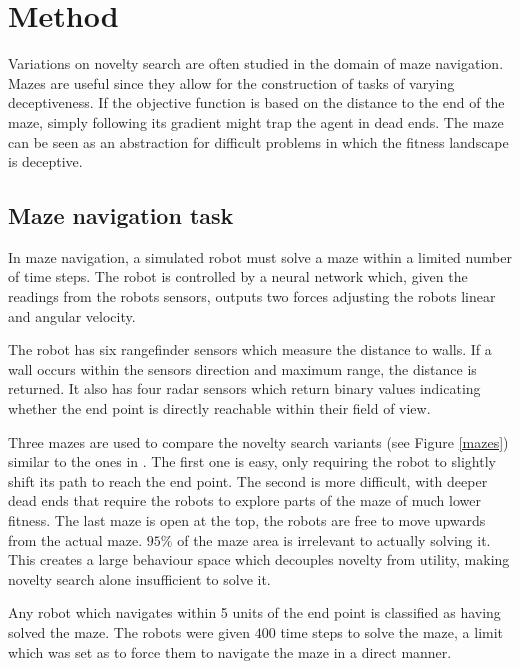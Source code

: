 \section{Method}
Variations on novelty search are often studied in the domain of maze navigation. Mazes are useful
since they allow for the construction of tasks of varying deceptiveness. If the objective function is
based on the distance to the end of the maze, simply following its gradient might trap the agent in
dead ends. The maze can be seen as an abstraction for difficult problems in which the fitness
landscape is deceptive.

\subsection{Maze navigation task}
In maze navigation, a simulated robot must solve a maze within a limited number of time steps.
The robot is controlled by a neural network which, given the readings from the robots sensors,
outputs two forces adjusting the robots linear and angular velocity.

The robot has six rangefinder sensors which measure the distance to walls. If a wall occurs within the sensors
direction and maximum range, the distance is returned. It also has four radar sensors which return binary
values indicating whether the end point is directly reachable within their field of view.

Three mazes are used to compare the novelty search variants (see Figure \ref{mazes}) similar to the ones in \cite{ns_study, novelty_alone}.
The first one is easy, only requiring the robot to slightly shift its path to reach the end point. The second is more
difficult, with deeper dead ends that require the robots to explore parts of the maze of much lower fitness.
The last maze is open at the top, the robots are free to move upwards from the actual maze.
$95 \%$ of the maze area is irrelevant to actually solving it. This creates a
large behaviour space which decouples novelty from utility, making novelty search alone insufficient
to solve it.

Any robot which navigates within 5 units of the end point is classified as having solved the maze. The robots
were given $400$ time steps to solve the maze, a limit which was set as to force them to navigate the maze
in a direct manner.


